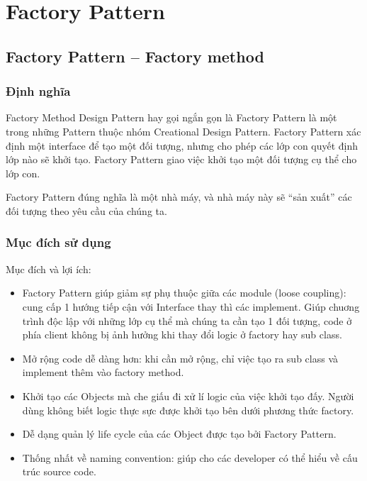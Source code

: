 \chapter{Factory Pattern }
\section{Factory Pattern – Factory method}
\subsection{Định nghĩa}

Factory Method Design Pattern hay gọi ngắn gọn là Factory Pattern là một trong những Pattern thuộc nhóm Creational Design Pattern. Factory Pattern xác định một interface để tạo một đối tượng, nhưng cho phép các lớp con quyết định lớp nào sẽ khởi tạo.  Factory Pattern giao việc khởi tạo một đối tượng cụ thể cho lớp con.

Factory Pattern đúng nghĩa là một nhà máy, và nhà máy này sẽ “sản xuất” các đối tượng theo yêu cầu của chúng ta.

\subsection{Mục đích sử dụng}
Mục đích và lợi ích:
\begin{itemize}
\item	Factory Pattern giúp giảm sự phụ thuộc giữa các module (loose coupling): cung cấp 1 hướng tiếp cận với Interface thay thì các implement. Giúp chuơng trình độc lập với những lớp cụ thể mà chúng ta cần tạo 1 đối tượng, code ở phía client không bị ảnh hưởng khi thay đổi logic ở factory hay sub class.
\item Mở rộng code dễ dàng hơn: khi cần mở rộng, chỉ việc tạo ra sub class và implement thêm vào factory method.
\item Khởi tạo các Objects mà che giấu đi xử lí logic của việc khởi tạo đấy. Người dùng không biết logic thực sực được khởi tạo bên dưới phương thức factory.
\item Dễ dạng quản lý life cycle của các Object được tạo bởi Factory Pattern.
\item Thống nhất về naming convention: giúp cho các developer có thể hiểu về cấu trúc source code.
\end{itemize}

